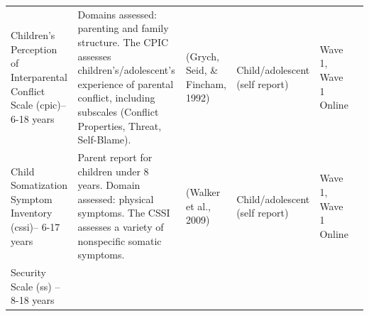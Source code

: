 \documentclass[
]{book}
\begin{document}
\begin{longtable}[]{@{}llllll@{}}
\begin{minipage}[t]{0.18\columnwidth}\raggedright
Children's Perception of Interparental Conflict Scale (cpic)-- 6-18 years\strut
\end{minipage} & \begin{minipage}[t]{0.18\columnwidth}\raggedright
Domains assessed: parenting and family structure. The CPIC assesses children's/adolescent's experience of parental conflict, including subscales (Conflict Properties, Threat, Self-Blame).\strut
\end{minipage} & \begin{minipage}[t]{0.15\columnwidth}\raggedright
(Grych, Seid, \& Fincham, 1992)\strut
\end{minipage} & \begin{minipage}[t]{0.16\columnwidth}\raggedright
Child/adolescent (self report)\strut
\end{minipage} & \begin{minipage}[t]{0.06\columnwidth}\raggedright
Wave 1, Wave 1 Online\strut
\end{minipage} & \begin{minipage}[t]{0.10\columnwidth}\raggedright
\strut
\end{minipage}\tabularnewline
\begin{minipage}[t]{0.18\columnwidth}\raggedright
Child Somatization Symptom Inventory (cssi)-- 6-17 years\strut
\end{minipage} & \begin{minipage}[t]{0.18\columnwidth}\raggedright
Parent report for children under 8 years. Domain assessed: physical symptoms. The CSSI assesses a variety of nonspecific somatic symptoms.\strut
\end{minipage} & \begin{minipage}[t]{0.15\columnwidth}\raggedright
(Walker et al., 2009)\strut
\end{minipage} & \begin{minipage}[t]{0.16\columnwidth}\raggedright
Child/adolescent (self report)\strut
\end{minipage} & \begin{minipage}[t]{0.06\columnwidth}\raggedright
Wave 1, Wave 1 Online\strut
\end{minipage} & \begin{minipage}[t]{0.10\columnwidth}\raggedright
\strut
\end{minipage}\tabularnewline
\begin{minipage}[t]{0.18\columnwidth}\raggedright
Security Scale (ss) -- 8-18 years\strut

\end{minipage}
\end{longtable}
\end{document}
